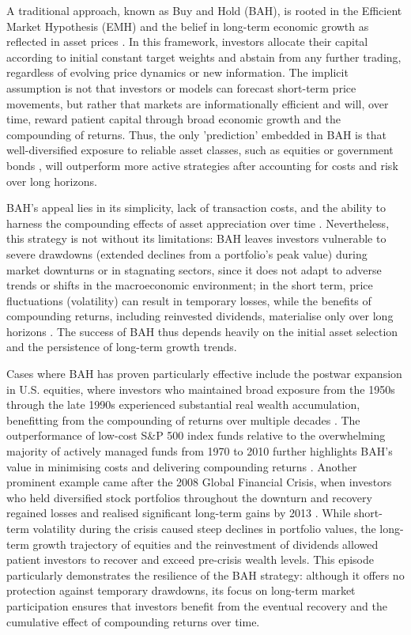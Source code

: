 \documentclass[12pt,a4paper]{report}
\begin{document}
A traditional approach, known as Buy and Hold (BAH), is rooted in the Efficient Market Hypothesis (EMH) and the belief in long-term economic growth as reflected in asset prices \citep{Fama1970}. In this framework, investors allocate their capital according to initial constant target weights and abstain from any further trading, regardless of evolving price dynamics or new information. The implicit assumption is not that investors or models can forecast short-term price movements, but rather that markets are informationally efficient and will, over time, reward patient capital through broad economic growth and the compounding of returns. Thus, the only 'prediction' embedded in BAH is that well-diversified exposure to reliable asset classes, such as equities or government bonds \citep{Malkiel2019}, will outperform more active strategies after accounting for costs and risk over long horizons.

BAH’s appeal lies in its simplicity, lack of transaction costs, and the ability to harness the compounding effects of asset appreciation over time \citep{Bogle1999}. Nevertheless, this strategy is not without its limitations: BAH leaves investors vulnerable to severe drawdowns (extended declines from a portfolio’s peak value) during market downturns or in stagnating sectors, since it does not adapt to adverse trends or shifts in the macroeconomic environment; in the short term, price fluctuations (volatility) can result in temporary losses, while the benefits of compounding returns, including reinvested dividends, materialise only over long horizons \citep{Malkiel2019}. The success of BAH thus depends heavily on the initial asset selection and the persistence of long-term growth trends.

Cases where BAH has proven particularly effective include the postwar expansion in U.S. equities, where investors who maintained broad exposure from the 1950s through the late 1990s experienced substantial real wealth accumulation, benefitting from the compounding of returns over multiple decades \citep{Siegel1998}. The outperformance of low-cost S\&P 500 index funds relative to the overwhelming majority of actively managed funds from 1970 to 2010 further highlights BAH’s value in minimising costs and delivering compounding returns \citep{French2008}. Another prominent example came after the 2008 Global Financial Crisis, when investors who held diversified stock portfolios throughout the downturn and recovery regained losses and realised significant long-term gains by 2013 \citep{Bogle2012, Malkiel2019}. While short-term volatility during the crisis caused steep declines in portfolio values, the long-term growth trajectory of equities and the reinvestment of dividends allowed patient investors to recover and exceed pre-crisis wealth levels. This episode particularly demonstrates the resilience of the BAH strategy: although it offers no protection against temporary drawdowns, its focus on long-term market participation ensures that investors benefit from the eventual recovery and the cumulative effect of compounding returns over time.
\end{document}
